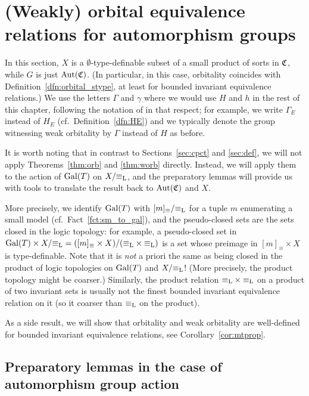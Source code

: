 	\section[Automorphism group actions]{(Weakly) orbital equivalence relations for automorphism groups}
	\label{sec:aut}
	In this section, $X$ is a $\emptyset$-type-definable subset of a small product of sorts in ${\mathfrak C}$, while $G$ is just $\operatorname{{Aut}}({\mathfrak C})$. (In particular, in this case, orbitality coincides with Definition~\ref{dfn:orbital_stype}, at least for bounded invariant equivalence relations.) We use the letters $\Gamma$ and $\gamma$ where we would use $H$ and $h$ in the rest of this chapter, following the notation of \cite{KR16} in that respect; for example, we write $\Gamma_E$ instead of $H_E$ (cf.\ Definition~\ref{dfn:HE}) and we typically denote the group witnessing weak orbitality by $\Gamma$ instead of $H$ as before.
	
	It is worth noting that in contrast to Sections~\ref{sec:cpct} and \ref{sec:def}, we will not apply Theorems~\ref{thm:orb} and \ref{thm:worb} directly. Instead, we will apply them to the action of $\operatorname{{Gal}}(T)$ on $X/{\equiv_{\mathrm{L}}}$, and the preparatory lemmas will provide us with tools to translate the result back to $\operatorname{{Aut}}({\mathfrak C})$ and $X$.
	
	More precisely, we identify $\operatorname{{Gal}}(T)$ with $[m]_\equiv/{\equiv_{\mathrm{L}}}$ for a tuple $m$ enumerating a small model (cf.\ Fact~\ref{fct:sm_to_gal}), and the pseudo-closed sets are the sets closed in the logic topology: for example, a pseudo-closed set in $\operatorname{{Gal}}(T)\times X/{\equiv_{\mathrm{L}}}=([m]_\equiv\times X)/({\equiv_{\mathrm{L}}}\times {\equiv_{\mathrm{L}}})$ is a set whose preimage in $[m]_\equiv\times X$ is type-definable. Note that it is \emph{not} a priori the same as being closed in the product of logic topologies on $\operatorname{{Gal}}(T)$ and $X/{\equiv_{\mathrm{L}}}$! (More precisely, the product topology might be coarser.) Similarly, the product relation ${\equiv_{\mathrm{L}}}\times{\equiv_{\mathrm{L}}}$ on a product of two invariant sets is usually not the finest bounded invariant equivalence relation on it (so it coarser than $\equiv_{\mathrm{L}}$ on the product).
	
	As a side result, we will show that orbitality and weak orbitality are well-defined for bounded invariant equivalence relations, see Corollary~\ref{cor:mtprop}.
	
	
	\subsection*{Preparatory lemmas in the case of automorphism group action}
	
